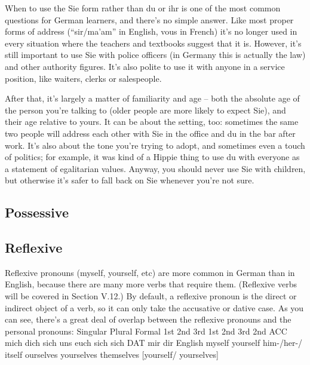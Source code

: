 \documentclass[a4paper,twocolumn,10pt]{article}
\newcommand{\subsectionend}
{
\nolinenumbers
\linenumbers
}
\begin{document}
When to use the Sie form rather than du or ihr is one of the most common
questions for German learners, and there's no simple answer. Like most proper
forms of address (“sir/ma’am” in English, vous in French) it’s no longer used in
every situation where the teachers and textbooks suggest that it is. However,
it’s still important to use Sie with police officers (in Germany this is
actually the law) and other authority figures. It’s also polite to use it with
anyone in a service position, like waiters, clerks or salespeople.

After that, it’s largely a matter of familiarity and age – both the absolute age
of the person you’re talking to (older people are more likely to expect Sie),
and their age relative to yours. It can be about the setting, too: sometimes the
same two people will address each other with Sie in the office and du in the bar
after work. It’s also about the tone you’re trying to adopt, and sometimes even
a touch of politics; for example, it was kind of a Hippie thing to use du with
everyone as a statement of egalitarian values. Anyway, you should never use Sie
with children, but otherwise it’s safer to fall back on Sie whenever you’re not
sure.

\subsectionend

\subsection{Possessive}
\label{ssec:possessive}


\subsectionend

\subsection{Reflexive}
\label{ssec:reflexive}
Reflexive pronouns (myself, yourself, etc) are more common in German than in
English, because there are many more verbs that require them. (Reflexive verbs
will be covered in Section V.12.) By default, a reflexive pronoun is the direct
or indirect object of a verb, so it can only take the accusative or dative case.
As you can see, there's a great deal of overlap between the reflexive pronouns
and the personal pronouns:
	Singular 	Plural 	Formal
		1st 	2nd 	3rd 	1st 	2nd 	3rd 	2nd
		ACC 	mich 	dich 	sich 	uns 	euch 	sich 	sich
		DAT 	mir 	dir
		English 	myself 	yourself 	him-/her-/
		itself 	ourselves 	yourselves 	themselves 	[yourself/
		yourselves]
\end{document}
